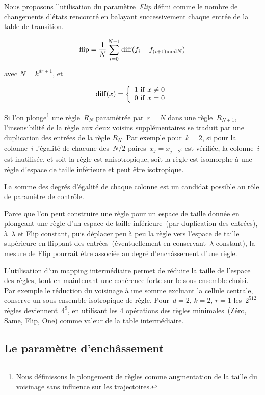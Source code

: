 Nous proposons l'utilisation du paramètre~\emph{Flip} défini comme le
nombre de changements d'états rencontré en balayant successivement
chaque entrée de la table de transition.

\[{\rm flip} =
\frac{1}{N}\sum_{i=0}^{N-1}{\rm diff}(f_{i}-f_{(i+1){\rm mod}N})\]

avec $N=k^{dr+1}$, et

\[{\rm diff}(x) = \left\lbrace
\begin{array}{l}
  1\ {\rm if}\ x \ne 0\\ 0\ {\rm if}\ x = 0
\end{array}
\right.\]

Si l'on plonge\footnote{%
  Nous définissons le plongement de règles comme augmentation de la
  taille du voisinage sans influence sur les trajectoires.} %
une règle~$R_{N}$ paramétrée par~$r = N$ dans une
règle~$R_{N + 1}$, l'insensibilité de la règle aux deux voisins
supplémentaires se traduit par une duplication des entrées de la règle
$R_{N}$. %
Par exemple pour~$k = 2$, si pour la colonne~$i$ l'égalité de chacune
des~$N/2$ paires~$x_{j} = x_{j + 2^{i}}$ est vérifiée, la colonne~$i$
est inutilisée, et soit la règle est anisotropique, soit la règle est
isomorphe à une règle d'espace de taille inférieure et peut être
isotropique.

La somme des degrés d'égalité de chaque colonne est un candidat
possible au rôle de paramètre de contrôle.

Parce que l'on peut construire une règle pour un espace de taille
donnée en plongeant une règle d'un espace de taille inférieure~(par
duplication des entrées), à~$\lambda$ et Flip constant, puis déplacer
peu à peu la règle vers l'espace de taille supérieure en flippant des
entrées~(éventuellement en conservant~$\lambda$ constant), la mesure
de Flip pourrait être associée au degré d'enchâssement d'une règle.

L'utilisation d'un mapping intermédiaire permet de réduire la taille
de l'espace des règles, tout en maintenant une cohérence forte sur le
sous-ensemble choisi. %
Par exemple le réduction du voisinage à une somme excluant la cellule
centrale, conserve un sous ensemble isotropique de règle. %
Pour~$d = 2$, $k = 2$, $r = 1$ les~$2^{512}$ règles
deviennent~$4^{9}$, en utilisant les 4 opérations des règles
minimales~(Zéro, Same, Flip, One) comme valeur de la table
intermédiaire. %

\subsection*{Le paramètre d'enchâssement}

